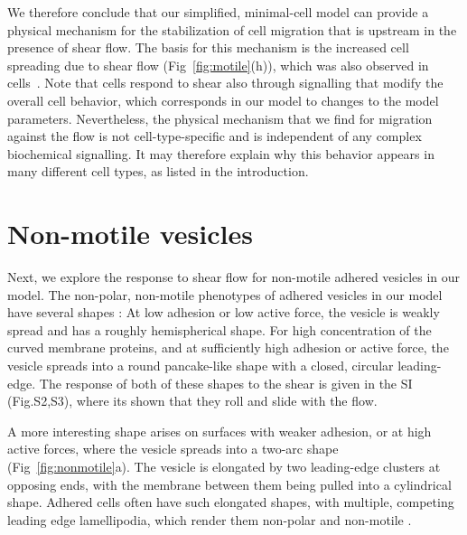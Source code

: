 \documentclass[
reprint,
superscriptaddress,
 amsmath,amssymb,
 aps,
prl,
floatfix]{revtex4-2}
\begin{document}
We therefore conclude that our simplified, minimal-cell model can provide a physical mechanism for the stabilization of cell migration that is upstream in the presence of shear flow. The basis for this mechanism is the increased cell spreading due to shear flow (Fig~\ref{fig:motile}(h)), which was also observed in cells~\cite{Dominguez2015, ChotardGhodsnia2007}. Note that cells respond to shear also through signalling that modify the overall cell behavior, which corresponds in our model to changes to the model parameters. Nevertheless, the physical mechanism that we find for migration against the flow is not cell-type-specific and is independent of any complex biochemical signalling.
It may therefore explain why this behavior appears in many different cell types, as listed in the introduction.


\section{Non-motile vesicles}
Next, we explore the response to shear flow for non-motile adhered vesicles in our model. The non-polar, non-motile phenotypes of adhered vesicles in our model have several shapes \cite{sadhu2021modelling}: At low adhesion or low active force, the vesicle is weakly spread and has a roughly hemispherical shape. For high concentration of the curved membrane proteins, and at sufficiently high adhesion or active force, the vesicle spreads into a round pancake-like shape with a closed, circular leading-edge. The response of both of these shapes to the shear is given in the SI (Fig.S2,S3), where its shown that they roll and slide with the flow.

A more interesting shape arises on surfaces with weaker adhesion, or at high active forces, where the vesicle spreads into a two-arc shape (Fig~\ref{fig:nonmotile}a). The vesicle is elongated by two leading-edge clusters at opposing ends, with the membrane between them being pulled into a cylindrical shape. Adhered cells often have such elongated shapes, with multiple, competing leading edge lamellipodia, which render them non-polar and non-motile \cite{pankov2005rac,schaufler2016selective,singh2020cell,dimchev2021induced}.

\end{document}

